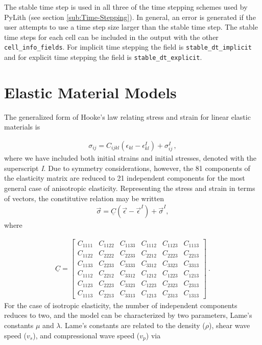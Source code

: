 The stable time step is used in all three of the time stepping schemes
used by PyLith (see section \ref{sub:Time-Stepping}). In general,
an error is generated if the user attempts to use a time step size
larger than the stable time step. The stable time steps for each cell
can be included in the output with the other \texttt{cell\_info\_fields}.
For implicit time stepping the field is \texttt{stable\_dt\_implicit}
and for explicit time stepping the field is \texttt{stable\_dt\_explicit}.


\section{Elastic Material Models}

The generalized form of Hooke's law relating stress and strain for
linear elastic materials is

\begin{gather}
\sigma_{ij}=C_{ijkl}\left(\epsilon_{kl}-\epsilon_{kl}^{I}\right)+\sigma_{ij}^{I}\,,\label{eq:1}
\end{gather}
where we have included both initial strains and initial stresses,
denoted with the superscript \textsl{I}. Due to symmetry considerations,
however, the 81 components of the elasticity matrix are reduced to
21 independent components for the most general case of anisotropic
elasticity. Representing the stress and strain in terms of vectors,
the constitutive relation may be written
\begin{gather}
\overrightarrow{\sigma}=\underline{C}\left(\vec{\epsilon}-\vec{\epsilon}^{I}\right)+\vec{\sigma}^{I},\label{eq:2}
\end{gather}
where

\begin{gather}
\underline{C}=\left[\begin{array}{cccccc}
C_{1111} & C_{1122} & C_{1133} & C_{1112} & C_{1123} & C_{1113}\\
C_{1122} & C_{2222} & C_{2233} & C_{2212} & C_{2223} & C_{2213}\\
C_{1133} & C_{2233} & C_{3333} & C_{3312} & C_{3323} & C_{3313}\\
C_{1112} & C_{2212} & C_{3312} & C_{1212} & C_{1223} & C_{1213}\\
C_{1123} & C_{2223} & C_{3323} & C_{1223} & C_{2323} & C_{2313}\\
C_{1113} & C_{2213} & C_{3313} & C_{1213} & C_{2313} & C_{1313}
\end{array}\right]\:.\label{eq:3}
\end{gather}
For the case of isotropic elasticity, the number of independent components
reduces to two, and the model can be characterized by two parameters,
Lame's constants $\mu$ and $\lambda$. Lame's constants are related
to the density ($\rho$), shear wave speed ($v_{s}$), and compressional
wave speed ($v_{p}$) via

